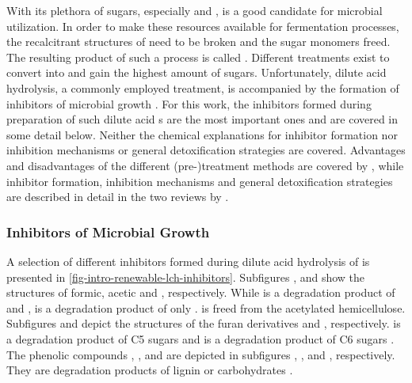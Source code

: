 With its plethora of sugars, especially \glc{} and \xyl{}, \lcbm{} is a good candidate for microbial utilization. In order to make these resources available for fermentation processes, the recalcitrant structures of \lcbm{} need to be broken and the sugar monomers freed. The resulting product of such a process is called \lch{}. Different treatments exist to convert \lcbm{} into \lch{} and gain the highest amount of sugars. Unfortunately, dilute acid hydrolysis, a commonly employed treatment, is accompanied by the formation of inhibitors of microbial growth \cite{Sun2002, Klinke2004}. For this work, the inhibitors formed during preparation of such dilute acid \lch{}s are the most important ones and are covered in some detail below. Neither the chemical explanations for inhibitor formation nor inhibition mechanisms or general detoxification strategies are covered. Advantages and disadvantages of the different (pre-)treatment methods are covered by \textcite{Brodeur2011}, while inhibitor formation, inhibition mechanisms and general detoxification strategies are described in detail in the two reviews by \textcite{Palmqvist2000a, Palmqvist2000b}.

\subsubsection{Inhibitors of Microbial Growth}
A selection of different inhibitors formed during dilute acid hydrolysis of \lcbm{} is presented in \vref{fig-intro-renewable-lch-inhibitors}. Subfigures ,  and  show the structures of formic, acetic and \laev{}, respectively. While \fora{} is a degradation product of \fur{} \cite{Grote1875, Dunlop1948} and \hmf{}, \laev{} is a degradation product of only \hmf{} \cite{Horvat1985}. \Acet{} is freed from the acetylated hemicellulose. Subfigures  and  depict the structures of the furan derivatives \fur{} and \hmf{}, respectively. \FUR{} is a degradation product of C5 sugars \cite{Dunlop1948} and \hmf{} is a degradation product of C6 sugars \cite{Heimlich1960, Feather1970, Taylor1972, Fukuchi1977}. The phenolic compounds \syr{}, \van{}, \ga{} and \phba{} are depicted in subfigures , ,  and , respectively. They are degradation products of lignin \cite{Bardet1985, Lapierre1983, Sears1971} or carbohydrates \cite{Popoff1976, Suortti1983}.

